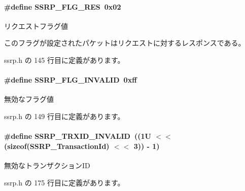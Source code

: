 \paragraph[{S\+S\+R\+P\+\_\+\+F\+L\+G\+\_\+\+R\+E\+S}]{\setlength{\rightskip}{0pt plus 5cm}\#define S\+S\+R\+P\+\_\+\+F\+L\+G\+\_\+\+R\+E\+S~0x02}\label{ssrp_8h_a91a5d266efbbb5610972e92f977b0d7c_a91a5d266efbbb5610972e92f977b0d7c}


リクエストフラグ値 

このフラグが設定されたパケットはリクエストに対するレスポンスである。 

 ssrp.\+h の 145 行目に定義があります。

\paragraph[{S\+S\+R\+P\+\_\+\+F\+L\+G\+\_\+\+I\+N\+V\+A\+L\+I\+D}]{\setlength{\rightskip}{0pt plus 5cm}\#define S\+S\+R\+P\+\_\+\+F\+L\+G\+\_\+\+I\+N\+V\+A\+L\+I\+D~0xff}\label{ssrp_8h_a67e77a6c4c2d37ba09c35d52b201b460_a67e77a6c4c2d37ba09c35d52b201b460}


無効なフラグ値 



 ssrp.\+h の 149 行目に定義があります。

\paragraph[{S\+S\+R\+P\+\_\+\+T\+R\+X\+I\+D\+\_\+\+I\+N\+V\+A\+L\+I\+D}]{\setlength{\rightskip}{0pt plus 5cm}\#define S\+S\+R\+P\+\_\+\+T\+R\+X\+I\+D\+\_\+\+I\+N\+V\+A\+L\+I\+D~((1\+U $<$$<$ (sizeof(\+S\+S\+R\+P\+\_\+\+Transaction\+Id) $<$$<$ 3)) -\/ 1)}\label{ssrp_8h_ac33b3f1d187ccea5d71660f018bd26e9_ac33b3f1d187ccea5d71660f018bd26e9}


無効なトランザクション\+I\+D 



 ssrp.\+h の 175 行目に定義があります。

